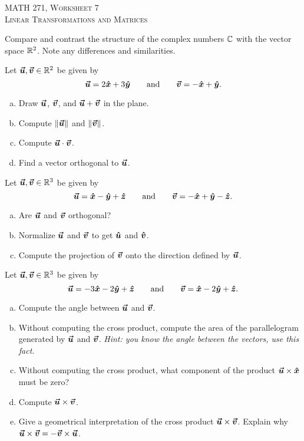 \documentclass[12pt]{article} %
\begin{document}
\begin{center}
   \textsc{\large MATH 271, Worksheet 7}\\
   \textsc{Linear Transformations and Matrices}
\end{center}
\vspace{.5cm}

\begin{problem}
Compare and contrast the structure of the complex numbers $\C$ with the vector space $\R^2$.  Note any differences and similarities.
\end{problem}

\begin{problem}
Let $\vecu,\vecv\in \R^2$ be given by
\[
\vecu = 2\xhat + 3 \yhat \qquad \textrm{and} \qquad \vecv = -\xhat +\yhat.
\]
\begin{enumerate}[(a)]
    \item Draw $\vecu$, $\vecv$, and $\vecu + \vecv$ in the plane.
    \item Compute $\|\vecu\|$ and $\|\vecv\|$.
    \item Compute $\vecu \cdot \vecv$.
    \item Find a vector orthogonal to $\vecu$.
\end{enumerate}
\end{problem}

\begin{problem}
Let $\vecu,\vecv\in \R^3$ be given by
\[
\vecu = \xhat - \yhat + \zhat \qquad \textrm{and} \qquad \vecv = -\xhat + \yhat - \zhat.
\]
\begin{enumerate}[(a)]
    \item Are $\vecu$ and $\vecv$ orthogonal?
    \item Normalize $\vecu$ and $\vecv$ to get $\uhat$ and $\vhat$. 
    \item Compute the projection of $\vecv$ onto the direction defined by $\vecu$.
\end{enumerate}
\end{problem}

\begin{problem}
Let $\vecu,\vecv \in \R^3$ be given by
\[
\vecu = -3\xhat -2\yhat + \zhat \qquad \textrm{and} \qquad \vecv = \xhat -2\yhat +\zhat.
\]
\begin{enumerate}[(a)]
    \item Compute the angle between $\vecu$ and $\vecv$.
    \item Without computing the cross product, compute the area of the parallelogram generated by $\vecu$ and $\vecv$. \emph{Hint: you know the angle between the vectors, use this fact.}
    \item Without computing the cross product, what component of the product $\vecu\times\xhat$ must be zero? 
    \item Compute $\vecu\times \vecv$.
    \item Give a geometrical interpretation of the cross product $\vecu\times \vecv$. Explain why $\vecu\times \vecv = -\vecv \times \vecu$.
\end{enumerate}
\end{problem}
\end{document}
